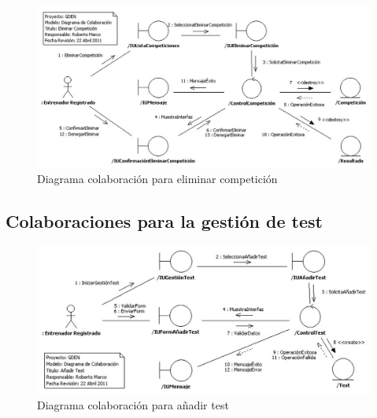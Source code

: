 			\begin{figure}[H]
			  \centering
			    \includegraphics[width=16cm]{./eps/colaboraciones/gestion_competiciones/EliminarCompeticion.eps}
			  \caption{Diagrama colaboración para eliminar competición}
			  \label{fig:col_eliminar_competicion}
			\end{figure}
			
		
		\subsection{Colaboraciones para la gestión de test} %
			\label{sub:colaboraciones_para_la_gestion_de_test}
			
			\begin{figure}[H]
			  \centering
			    \includegraphics[width=16cm]{./eps/colaboraciones/gestion_test/AnadirTest.eps}
			  \caption{Diagrama colaboración para añadir test}
			  \label{fig:col_anadir_test}
			\end{figure}
			

